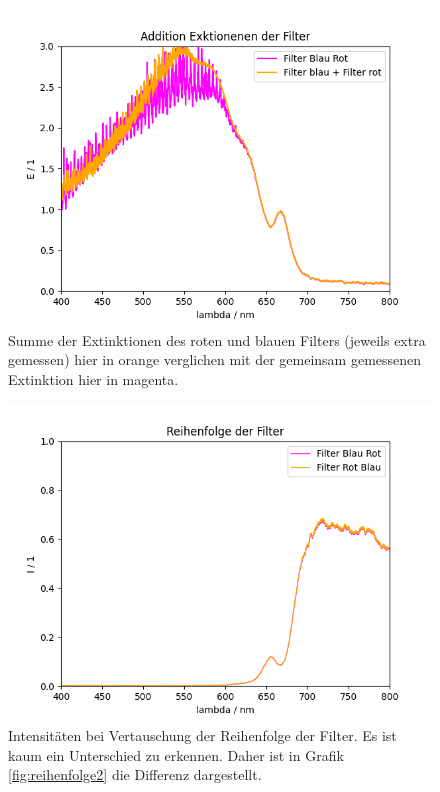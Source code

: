 \documentclass{article}
\begin{document}
\begin{figure}[H]
\centering
\caption{Summe der Extinktionen des roten und blauen Filters (jeweils extra gemessen) hier in orange verglichen mit der gemeinsam gemessenen Extinktion hier in magenta.}
\label{fig:sum_ext}
\includegraphics[scale=0.7]{Extinktionen_addition.png}
\end{figure}


\begin{figure}[H]
\centering
\caption{Intensitäten bei Vertauschung der Reihenfolge der Filter. Es ist kaum ein Unterschied zu erkennen. Daher ist in Grafik \ref{fig:reihenfolge2} die Differenz dargestellt.}
\label{fig:reihenfolge1}

\includegraphics[scale=0.7]{reihenfolge1.png}
\end{figure}
\end{document}
